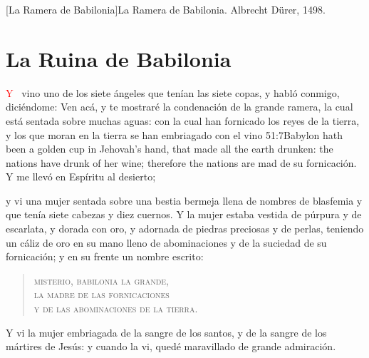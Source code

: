 [La Ramera de Babilonia]{La Ramera de Babilonia. Albrecht Dürer, 1498.}

\chapter{La Ruina de Babilonia}
\lettrine[lines=3,slope=-0.5em,loversize=0.1]{\textcolor{red}{Y}}{\ } vino uno de los siete ángeles que tenían las siete copas, y habló conmigo, diciéndome: Ven acá, y te mostraré la condenación de la grande ramera, la cual está sentada sobre muchas aguas:%
con la cual han fornicado los reyes de la tierra,%
 y los que moran en la tierra se han embriagado con el vino%
					  {51:7}{Babylon hath been a golden cup in Jehovah’s hand, that made all the earth drunken: the nations have drunk of her wine; therefore the nations are mad}
 de su fornicación.%
Y me llevó en Espíritu al desierto; 

y vi una mujer sentada sobre una bestia bermeja llena de nombres de blasfemia y que tenía siete cabezas y diez cuernos. 
Y la mujer estaba vestida de púrpura y de escarlata, y dorada con oro, y adornada de piedras preciosas y de perlas,%
 teniendo un cáliz de oro en su mano lleno de abominaciones y de la suciedad de su fornicación; 
y en su frente un nombre escrito:%
\begin{verse}
\textsc{misterio, babilonia la grande,\\ 
la madre de las fornicaciones\\ 
y de las abominaciones de la tierra.}
\end{verse}
Y vi la mujer embriagada de la sangre de los santos, y de la sangre de los mártires de Jesús: y cuando la vi, quedé maravillado de grande admiración. 

